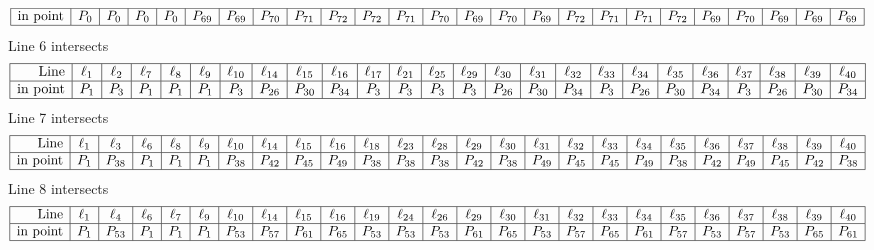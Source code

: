 \documentclass{article}
\begin{document}
{$$\begin{array}{|r*{24}{|c}|}
\hline
\mbox{in point}  & P_{0} & P_{0} & P_{0} & P_{0} & P_{69} & P_{69} & P_{70} & P_{71} & P_{72} & P_{72} & P_{71} & P_{70} & P_{69} & P_{70} & P_{69} & P_{72} & P_{71} & P_{71} & P_{72} & P_{69} & P_{70} & P_{69} & P_{69} & P_{69}\\
\hline
\end{array}
$$
Line 6 intersects 
$$
\begin{array}{|r*{24}{|c}|}
\hline
\mbox{Line}  & \ell_{1} & \ell_{2} & \ell_{7} & \ell_{8} & \ell_{9} & \ell_{10} & \ell_{14} & \ell_{15} & \ell_{16} & \ell_{17} & \ell_{21} & \ell_{25} & \ell_{29} & \ell_{30} & \ell_{31} & \ell_{32} & \ell_{33} & \ell_{34} & \ell_{35} & \ell_{36} & \ell_{37} & \ell_{38} & \ell_{39} & \ell_{40}\\
\hline
\mbox{in point}  & P_{1} & P_{3} & P_{1} & P_{1} & P_{1} & P_{3} & P_{26} & P_{30} & P_{34} & P_{3} & P_{3} & P_{3} & P_{3} & P_{26} & P_{30} & P_{34} & P_{3} & P_{26} & P_{30} & P_{34} & P_{3} & P_{26} & P_{30} & P_{34}\\
\hline
\end{array}
$$
Line 7 intersects 
$$
\begin{array}{|r*{24}{|c}|}
\hline
\mbox{Line}  & \ell_{1} & \ell_{3} & \ell_{6} & \ell_{8} & \ell_{9} & \ell_{10} & \ell_{14} & \ell_{15} & \ell_{16} & \ell_{18} & \ell_{23} & \ell_{28} & \ell_{29} & \ell_{30} & \ell_{31} & \ell_{32} & \ell_{33} & \ell_{34} & \ell_{35} & \ell_{36} & \ell_{37} & \ell_{38} & \ell_{39} & \ell_{40}\\
\hline
\mbox{in point}  & P_{1} & P_{38} & P_{1} & P_{1} & P_{1} & P_{38} & P_{42} & P_{45} & P_{49} & P_{38} & P_{38} & P_{38} & P_{42} & P_{38} & P_{49} & P_{45} & P_{45} & P_{49} & P_{38} & P_{42} & P_{49} & P_{45} & P_{42} & P_{38}\\
\hline
\end{array}
$$
Line 8 intersects 
$$
\begin{array}{|r*{24}{|c}|}
\hline
\mbox{Line}  & \ell_{1} & \ell_{4} & \ell_{6} & \ell_{7} & \ell_{9} & \ell_{10} & \ell_{14} & \ell_{15} & \ell_{16} & \ell_{19} & \ell_{24} & \ell_{26} & \ell_{29} & \ell_{30} & \ell_{31} & \ell_{32} & \ell_{33} & \ell_{34} & \ell_{35} & \ell_{36} & \ell_{37} & \ell_{38} & \ell_{39} & \ell_{40}\\
\hline
\mbox{in point}  & P_{1} & P_{53} & P_{1} & P_{1} & P_{1} & P_{53} & P_{57} & P_{61} & P_{65} & P_{53} & P_{53} & P_{53} & P_{61} & P_{65} & P_{53} & P_{57} & P_{65} & P_{61} & P_{57} & P_{53} & P_{57} & P_{53} & P_{65} & P_{61}\\
\hline

\end{array}$$}
\end{document}
